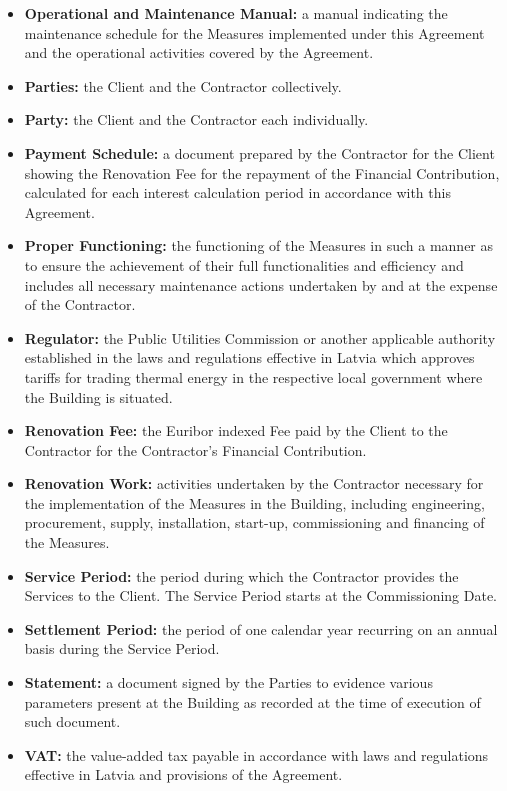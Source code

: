 \begin{multicols}{2}
\begin{itemize}[label={}]
	\item\textbf{Operational and Maintenance Manual:}  a manual indicating the maintenance schedule for the Measures implemented under this Agreement and the operational activities covered by the Agreement.
	\item\textbf{Parties:} the Client and the Contractor collectively.
	\item\textbf{Party:} the Client and the Contractor each individually.
	\item\textbf{Payment Schedule:} a document prepared by the Contractor for the Client showing the Renovation Fee for the repayment of the Financial Contribution, calculated for each interest calculation period in accordance with this Agreement.
	\item\textbf{Proper Functioning:} the functioning of the Measures in such a manner as to ensure the achievement of their full functionalities and efficiency and includes all necessary maintenance actions undertaken by and at the expense of the Contractor.
	\item\textbf{Regulator:} the Public Utilities Commission or another applicable authority established in the laws and regulations effective in Latvia which approves tariffs for trading thermal energy in the respective local government where the Building is situated.
	\item\textbf{Renovation Fee:} the Euribor indexed Fee paid by the Client to the Contractor for the Contractor’s Financial Contribution.
	\item\textbf{Renovation Work:} activities undertaken by the Contractor necessary for the implementation of the Measures in the Building, including engineering, procurement, supply, installation, start-up, commissioning and financing of the Measures.
	\item\textbf{Service Period:} the period during which the Contractor provides the Services to the Client. The Service Period starts at the Commissioning Date.
	\item\textbf{Settlement Period:} the period of one calendar year recurring on an annual basis during the Service Period.
	\item\textbf{Statement:} a document signed by the Parties to evidence various parameters present at the Building as recorded at the time of execution of such document.
	\item\textbf{VAT:} the value-added tax payable in accordance with laws and regulations effective in Latvia and provisions of the Agreement.
\end{itemize}


\end{multicols}
